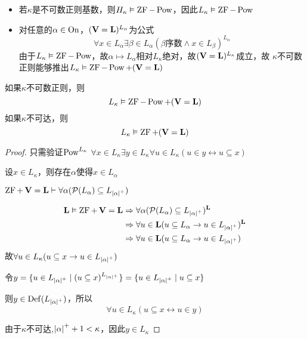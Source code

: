 \documentclass[11pt]{article}
\begin{document}
\begin{remark}
\begin{itemize}
\item 若\(\kappa\)是不可数正则基数，则\(H_\kappa\vDash\operatorname{ZF}-\operatorname{Pow}\)，因此\(L_\kappa\vDash\operatorname{ZF}-\operatorname{Pow}\)
\item 对任意的\(\alpha\in\operatorname{On}\)，\((\operatorname{\textbf{V}}=\operatorname{\textbf{L}})^{L_\alpha}\)为公式
\begin{equation*}
\forall x\in L_\alpha\exists\beta\in L_\alpha(\beta\text{序数}\wedge x\in L_\beta)^{L_\alpha}
\end{equation*}
由于\(L_\kappa\vDash\operatorname{ZF}-\operatorname{Pow}\)，故\(\alpha\mapsto L_\alpha\)相对\(L_\kappa\)绝对，故\((\operatorname{\textbf{V}}=\operatorname{\textbf{L}})^{L_\kappa}\)成立，故
\(\kappa\)不可数正则能够推出\(L_\kappa\vDash\operatorname{ZF}-\operatorname{Pow}+(\operatorname{\textbf{V}}=\operatorname{\textbf{L}})\)
\end{itemize}
\end{remark}

\begin{corollary}[]
如果\(\kappa\)不可数正则，则
\begin{equation*}
L_\kappa\vDash\operatorname{ZF}-\operatorname{Pow}+(\operatorname{\textbf{V}}=\operatorname{\textbf{L}})
\end{equation*}
如果\(\kappa\)不可达，则
\begin{equation*}
L_\kappa\vDash\operatorname{ZF}+(\operatorname{\textbf{V}}=\operatorname{\textbf{L}})
\end{equation*}
\end{corollary}

\begin{proof}
只需验证\(\operatorname{Pow}^{L_\kappa}\) \(\forall x\in L_\kappa\exists y\in L_\kappa\forall u\in L_\kappa(u\in y\leftrightarrow u\subseteq x)\)

设\(x\in L_\kappa\)，则存在\(\alpha\)使得\(x\in L_\alpha\)

\(\ZF+\bV=\bL\vdash\forall\alpha(\calp(L_\alpha)\subseteq L_{\abs{\alpha}^+})\)

\begin{align*}
\bL\vDash\ZF+\bV=\bL&\Rightarrow\forall\alpha(\calp(L_\alpha)\subseteq L_{\abs{\alpha}^+})^{\bL}\\
&\Rightarrow\forall u\in\bL(u\subseteq L_\alpha\to u\in L_{\abs{\alpha}^+})^{\bL}\\
&\Rightarrow\forall u\in\bL(u\subseteq L_\alpha\to u\in L_{\abs{\alpha}^+})
\end{align*}
故\(\forall u\in L_\kappa(u\subseteq x\to u\in L_{\abs{\alpha}^+})\)

令\(y=\{u\in L_{\abs{\alpha}^+}\mid(u\subseteq x)^{L_{\abs{\alpha}^+}}\}=\{u\in L_{\abs{\alpha}^+}\mid u\subseteq x\}\)

则\(y\in\Def(L_{\abs{\alpha}^+})\)，所以
\begin{equation*}
\forall u\in L_\kappa(u\subseteq x\leftrightarrow u\in y)
\end{equation*}

由于\(\kappa\)不可达,\(\abs{\alpha}^++1<\kappa\)，因此\(y\in L_\kappa\)
\end{proof}
\end{document}

